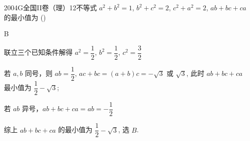 
\begin{problem}{2004}{G}{全国II卷（理）}{12}{不等式}
$a^{2}+b^{2}=1$, $b^{2}+c^{2}=2$, $c^{2}+a^{2}=2$, $ab+bc+ca$ 的最小值为  (\hspace{1cm})
\begin{choices}
\end{choices}
\end{problem}

\begin{answer}
B
\end{answer}

\begin{solutions}
联立三个已知条件解得 $a^{2}=\dfrac{1}{2}$, $b^{2}=\dfrac{1}{2}$, $c^{2}=\dfrac{3}{2}$

若 $a,b$ 同号，则 $ab=\dfrac{1}{2}$, $ac+bc=(a+b)c=-\sqrt{3}$ 或 $\sqrt{3}$, 此时 $ab+bc+ca$ 最小值为 $\dfrac{1}{2}-\sqrt{3}$;

若 $ab$ 异号，$ab+bc+ca=ab=-\dfrac{1}{2}$

综上 $ab+bc+ca$ 的最小值为 $\dfrac{1}{2}-\sqrt{3}$, 选 $B$.
\end{solutions}